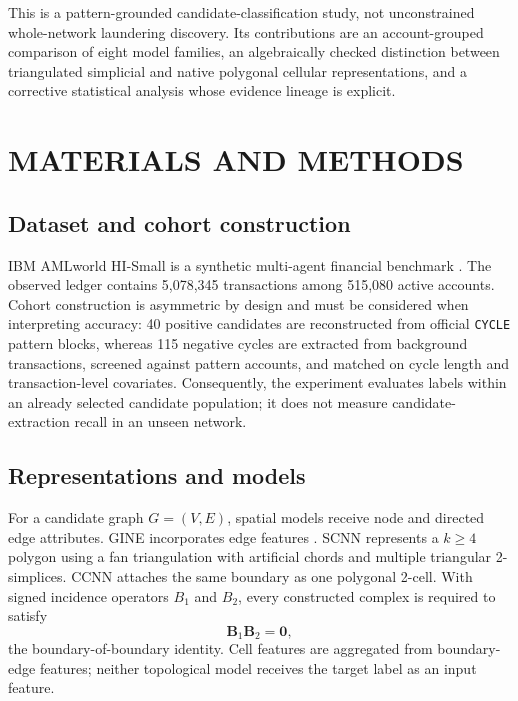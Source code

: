 \documentclass[12pt,a4paper]{article}
\begin{document}
This is a pattern-grounded candidate-classification study, not unconstrained whole-network laundering discovery. Its contributions are an account-grouped comparison of eight model families, an algebraically checked distinction between triangulated simplicial and native polygonal cellular representations, and a corrective statistical analysis whose evidence lineage is explicit.

\section{MATERIALS AND METHODS}
\subsection{Dataset and cohort construction}
IBM AMLworld HI-Small is a synthetic multi-agent financial benchmark \cite{altman2023realistic}. The observed ledger contains 5,078,345 transactions among 515,080 active accounts. Cohort construction is asymmetric by design and must be considered when interpreting accuracy: 40 positive candidates are reconstructed from official \texttt{CYCLE} pattern blocks, whereas 115 negative cycles are extracted from background transactions, screened against pattern accounts, and matched on cycle length and transaction-level covariates. Consequently, the experiment evaluates labels within an already selected candidate population; it does not measure candidate-extraction recall in an unseen network.



\subsection{Representations and models}
For a candidate graph $G=(V,E)$, spatial models receive node and directed edge attributes. GINE incorporates edge features \cite{hu2020strategies}. SCNN represents a $k\ge4$ polygon using a fan triangulation with artificial chords and multiple triangular 2-simplices. CCNN attaches the same boundary as one polygonal 2-cell. With signed incidence operators $B_1$ and $B_2$, every constructed complex is required to satisfy
\begin{equation}
  \mathbf{B}_1 \mathbf{B}_2 = \mathbf{0},
\end{equation}
the boundary-of-boundary identity. Cell features are aggregated from boundary-edge features; neither topological model receives the target label as an input feature.
\end{document}

